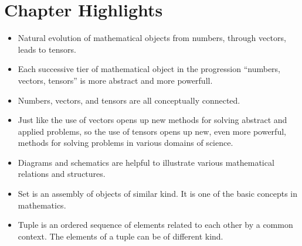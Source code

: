 \section*{Chapter Highlights}
{\chhc
  \it
  \small
\begin{itemize}
\item Natural evolution of mathematical objects from numbers, through
  vectors, leads to tensors.
\item Each successive tier of mathematical object in the progression
  ``numbers, vectors, tensors''  is more abstract and more powerfull.
\item Numbers, vectors, and tensors are all conceptually connected.
\item Just like the use of vectors opens up new methods for solving
  abstract and applied problems, so the use of tensors opens up new,
  even more powerful, methods for solving problems in various domains
  of science.
\item Diagrams and schematics are helpful to illustrate various
  mathematical relations and structures.
\item Set is an assembly of objects of similar kind. It is one of the
  basic concepts in mathematics.
\item Tuple is an ordered sequence of elements related to each other
  by a common context. The elements of a tuple can be of different kind.
\end{itemize}
}
